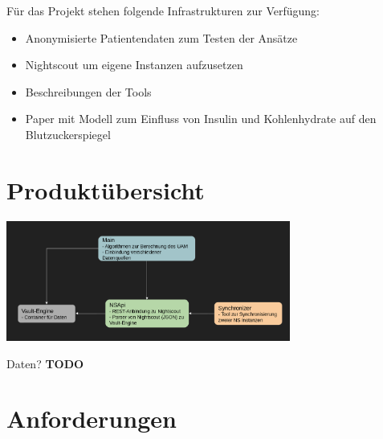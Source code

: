 \documentclass[accentcolor=tud0b,12pt,paper=a4]{tudreport}
\begin{document}
Für das Projekt stehen folgende Infrastrukturen zur Verfügung: 
\begin{itemize}
	\item Anonymisierte Patientendaten zum Testen der Ansätze
	\item Nightscout um eigene Instanzen aufzusetzen 
	\item Beschreibungen der Tools						%
	\item Paper mit Modell zum Einfluss von Insulin und Kohlenhydrate auf den Blutzuckerspiegel
\end{itemize}
	
	
{\let\clearpage\relax	\chapter{Produktübersicht}}
	

\begin{center}
\includegraphics[width=0.7\textwidth]{architektur.png}
\end{center}


Daten? \textbf{{\large TODO}}

	

 \chapter{Anforderungen}
\end{document}
